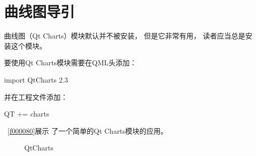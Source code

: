 ﻿




\FloatBarrier
\section{
曲线图导引
}\label{c000017s01}


曲线图（Qt Charts）模块默认并不被安装，
但是它非常有用，
读者应当总是安装这个模块。

要使用Qt Charts模块需要在QML头添加：\begin{littlelongworld}
import QtCharts 2.3
\end{littlelongworld}
并在工程文件添加：\begin{littlelongworld}
QT {\sourcefonttwo{}+}{\sourcefonttwo{}=} charts
\end{littlelongworld}

\filesourcenumbernameone\ \ref{f000080}展示
了一个简单的Qt Charts模块的应用。

\begin{figure}[htb] %
\marginnote{\setlength\fboxsep{2pt}\fbox{\footnotesize{\kaishu\figurename\,}\footnotesize{\ref{p000049}}}}\centering %
\setlength\fboxsep{0pt} %
\caption{QtCharts} %
\label{p000049} %
\end{figure}


